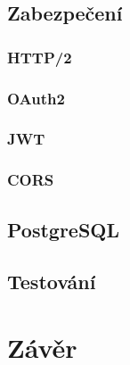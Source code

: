 \documentclass[a4paper,11pt,titlepage,fleqn]{article}
\begin{document}
    \subsection{Zabezpečení}

        \subsubsection{HTTP/2}

        \subsubsection{OAuth2}

        \subsubsection{JWT}

        \subsubsection{CORS}

    \subsection{PostgreSQL}

    \subsection{Testování}


\newpage
\section{Závěr}
\end{document}
